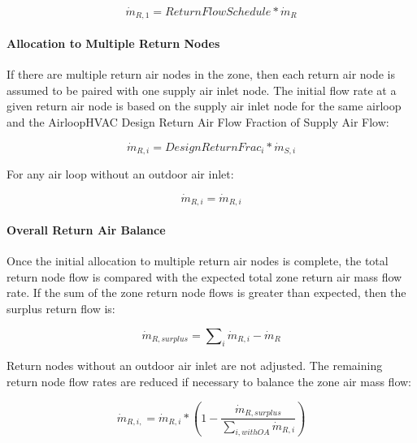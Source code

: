 \begin{equation}
{\dot m_{R,1}} = ReturnFlowSchedule*{\dot m_{R}}
\end{equation}

\paragraph{Allocation to Multiple Return Nodes}\label{allocation-to-multiple-return-nodes}

If there are multiple return air nodes in the zone, then each return air node is assumed to be paired with one supply air inlet node. The initial flow rate at a given return air node is based on the supply air inlet node for the same airloop and the AirloopHVAC Design Return Air Flow Fraction of Supply Air Flow:

\begin{equation}
{\dot m_{R,i}} = {DesignReturnFrac_i} * {\dot m_{S,i}}
\end{equation}

For any air loop without an outdoor air inlet:

\begin{equation}
{\dot m_{R,i}} = {\dot m_{R,i}}
\end{equation}

\paragraph{Overall Return Air Balance}\label{overall-return-air-balance}

Once the initial allocation to multiple return air nodes is complete, the total return node flow is compared with the expected total zone return air mass flow rate. If the sum of the zone return node flows is greater than expected, then the surplus return flow is:

\begin{equation}
{\dot m_{R,surplus}} = \sum\nolimits_i {{{\dot m}_{R,i}}} - {\dot m_{R}}
\end{equation}

Return nodes without an outdoor air inlet are not adjusted. The remaining return node flow rates are reduced if necessary to balance the zone air mass flow:

\begin{equation}
{\dot m_{R,i,}} = {\dot m_{R,i}} * \left( 1 - \frac{\dot m_{R,surplus}} {\sum\nolimits_{i,withOA} {{{\dot m}_{R,i}}}} \right) 
\end{equation}


